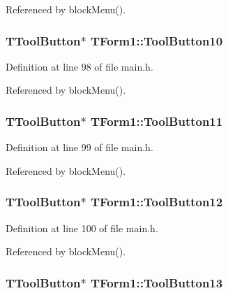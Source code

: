 Referenced by blockMenu().\hypertarget{classTForm1_3b3935ddfee9e1d21980a15a4cff512c}{
\subsubsection[ToolButton10]{\setlength{\rightskip}{0pt plus 5cm}TToolButton$\ast$ {\bf TForm1::ToolButton10}}}
\label{classTForm1_3b3935ddfee9e1d21980a15a4cff512c}




Definition at line 98 of file main.h.

Referenced by blockMenu().\hypertarget{classTForm1_878606b0648b29677e804bf2e2814ddd}{
\subsubsection[ToolButton11]{\setlength{\rightskip}{0pt plus 5cm}TToolButton$\ast$ {\bf TForm1::ToolButton11}}}
\label{classTForm1_878606b0648b29677e804bf2e2814ddd}




Definition at line 99 of file main.h.

Referenced by blockMenu().\hypertarget{classTForm1_165b84429874244e7adafd6a40d544fb}{
\subsubsection[ToolButton12]{\setlength{\rightskip}{0pt plus 5cm}TToolButton$\ast$ {\bf TForm1::ToolButton12}}}
\label{classTForm1_165b84429874244e7adafd6a40d544fb}




Definition at line 100 of file main.h.

Referenced by blockMenu().\hypertarget{classTForm1_abbbbef41138d1af9106b37203916115}{
\subsubsection[ToolButton13]{\setlength{\rightskip}{0pt plus 5cm}TToolButton$\ast$ {\bf TForm1::ToolButton13}}}
\label{classTForm1_abbbbef41138d1af9106b37203916115}




